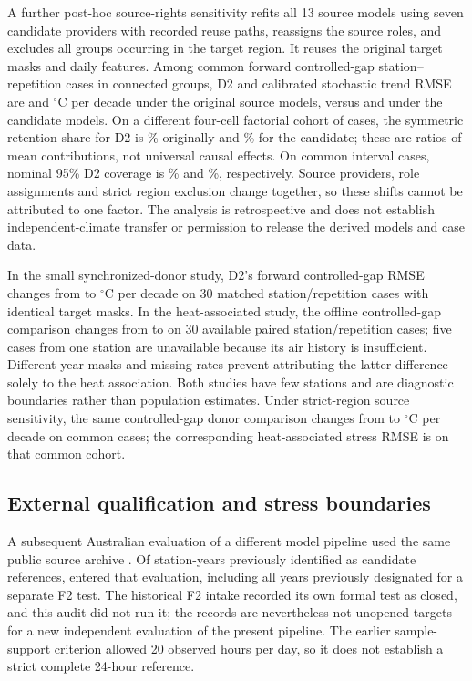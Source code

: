 \documentclass[draft,linenumbers]{agujournal2025}
\begin{document}
A further post-hoc source-rights sensitivity refits all 13 source models using seven candidate providers with recorded reuse paths, reassigns the source roles, and excludes all groups occurring in the target region. It reuses the original target masks and daily features. Among \OpenSourcePairs{} common forward controlled-gap station--repetition cases in \OpenSourceGroups{} connected groups, D2 and calibrated stochastic trend RMSE are \OpenSourceOldDTwo{} and \OpenSourceOldClassic{} $^{\circ}$C per decade under the original source models, versus \OpenSourceNewDTwo{} and \OpenSourceNewClassic{} under the candidate models. On a different four-cell factorial cohort of \OpenSourceFactorCases{} cases, the symmetric retention share for D2 is \OpenSourceOldRetention\% originally and \OpenSourceNewRetention\% for the candidate; these are ratios of mean contributions, not universal causal effects. On \OpenSourceCoverageCases{} common interval cases, nominal 95\% D2 coverage is \OpenSourceOldCoverage\% and \OpenSourceNewCoverage\%, respectively. Source providers, role assignments and strict region exclusion change together, so these shifts cannot be attributed to one factor. The analysis is retrospective and does not establish independent-climate transfer or permission to release the derived models and case data.

In the small synchronized-donor study, D2's forward controlled-gap RMSE changes from \WADonorBase{} to \WADonorStress{}$^{\circ}$C per decade on 30 matched station/repetition cases with identical target masks. In the heat-associated study, the offline controlled-gap comparison changes from \WAHeatBase{} to \WAHeatStress{} on 30 available paired station/repetition cases; five cases from one station are unavailable because its air history is insufficient. Different year masks and missing rates prevent attributing the latter difference solely to the heat association. Both studies have few stations and are diagnostic boundaries rather than population estimates. Under strict-region source sensitivity, the same controlled-gap donor comparison changes from \SRScenarioBaseNew{} to \SRDonorNew{}$^{\circ}$C per decade on \SRScenarioN{} common cases; the corresponding heat-associated stress RMSE is \SRHeatNew{} on that common cohort.

\subsection{External qualification and stress boundaries}
A subsequent Australian evaluation of a different model pipeline used the same public source archive \cite{bom2026}. Of \AURefYears{} station-years previously identified as candidate references, \AUFirstEvaluable{} entered that evaluation, including all \AUFormerTestEvaluable{} years previously designated for a separate F2 test. The historical F2 intake recorded its own formal test as closed, and this audit did not run it; the records are nevertheless not unopened targets for a new independent evaluation of the present pipeline. The earlier sample-support criterion allowed 20 observed hours per day, so it does not establish a strict complete 24-hour reference.
\end{document}
